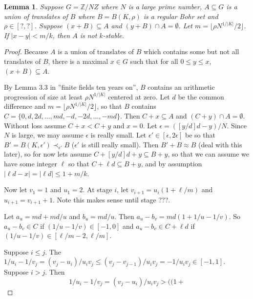 \documentclass[11pt]{article}
\newtheorem{lemma}{Lemma}
\theoremstyle{definition}
\begin{document}
\begin{lemma}
Suppose $G=\mathbb{Z}/NZ$ where $N$ is a large prime number, $A\subseteq G$ is a union of translates of $B$ where $B=B(K,\rho)$ is a regular Bohr set and $\rho \in [?,?]$.  Suppose $(x+B)\subseteq A$ and $(y+B)\cap A=\emptyset$.  Let $m=\lfloor \rho N^{1/|K|}/2\rfloor$.  If $|x-y|<m/k$, then $A$ is not $k$-stable.
\end{lemma}
\begin{proof}
Because $A$ is a union of translates of $B$ which contains some but not all translates of $B$, there is a maximal $x\in G$ such that for all $0\leq y\leq x$, $(x+B)\subseteq A$.


By Lemma 3.3 in ''finite fields ten years on'', $B$ contains an arithmetic progression of size at least $\rho N^{1/|K|}$ centered at zero. Let $d$ be the common difference and $m=\lfloor \rho N^{1/|K|}/2\rfloor$, so that $B$ contains $C=\{0,d,2d,\ldots, md, -d, -2d,\ldots, -md\}$.  Then $C+x\subseteq A$ and $(C+y)\cap A=\emptyset$.  Without loss assume $C+x<C+y$ and $x=0$.  Let $\epsilon=([y/d]d-y)/N$.  Since $N$ is large, we may assume $\epsilon$ is really small.  Let $\epsilon'\in [\epsilon,2\epsilon]$ be so that $B'=B(K,\epsilon')\prec_{\epsilon'}B$ ($\epsilon'$ is still really small).  Then $B'+B\approx B$ (deal with this later), so for now lets assume $C+[y/d]d+y\subseteq B+y$, so that we can assume we have some integer $\ell$ so that $C+\ell d \subseteq B+y$, and by assumption $|\ell d-x|=|\ell d|\leq 1+m/k$.

Now let $v_1=1$ and $u_1=2$.  At stage $i$, let $v_{i+1}=u_i(1+\ell/m)$ and $u_{i+1}=v_{i+1}+1$. Note this makes sense until stage ???.

Let $a_u=md+md/u$ and $b_u=md/u$.  Then $a_u-b_v=md(1+1/u-1/v)$.  So $a_u-b_v\in C$ if $(1/u-1/v)\in [-1,0]$ and $a_u-b_v\in C+\ell d$ if $(1/u-1/v)\in [\ell/m-2,\ell/m]$.


Suppose $i\leq j$.  The $1/u_i-1/v_j =(v_j-u_i)/u_iv_j \leq (v_j-v_{j-1})/u_iv_j =-1/u_iv_j\in [-1,1]$.  Suppose $i>j$.  Then 
$$
1/u_i-1/v_j =(v_j-u_i)/u_iv_j>((1+
$$
\end{proof}


 






\end{document}
